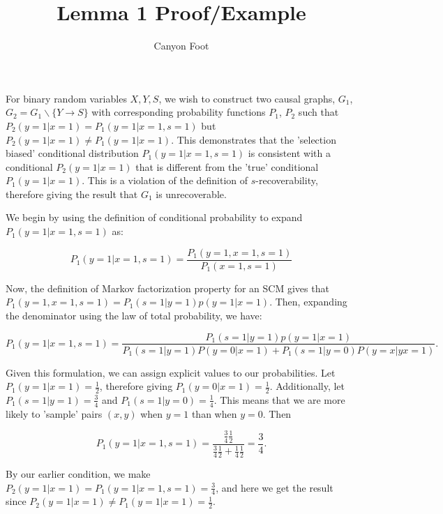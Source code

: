 \documentclass[12pt]{article}
\title{\vspace{-3cm} Lemma 1 Proof/Example}
\author{Canyon Foot}
\begin{document}
\maketitle

For binary random variables $X,Y,S$, we wish to construct two causal graphs, $G_1$, $G_2 = G_1 \backslash \{Y \rightarrow S\}$ with corresponding probability functions $P_1$, $P_2$ such that $P_2(y = 1 | x = 1) = P_1(y = 1 | x =1, s = 1)$ but $P_2(y = 1 | x = 1) \neq P_1(y = 1 | x =1)$. This demonstrates that the 'selection biased' conditional distribution $P_1(y = 1 | x =1, s = 1)$ is consistent with a conditional $P_2(y = 1 | x = 1)$ that is different from the 'true' conditional $P_1(y = 1 | x = 1)$. This is a violation of the definition of $s$-recoverability, therefore giving the result that $G_1$ is unrecoverable. 




We begin by using the definition of conditional probability to expand $P_1(y = 1 | x =1, s = 1)$ as:

$$P_1(y = 1 | x =1, s = 1) = \frac{P_1(y = 1, x =1, s = 1)}{P_1(x =1, s = 1)}$$

Now, the definition of Markov factorization property for an SCM gives that $P_1(y = 1, x =1, s = 1) =  P_1(s=1 | y = 1)p(y = 1 | x = 1)$. Then, expanding the denominator using the law of total probability, we have:

$$P_1(y = 1 | x =1, s = 1)  = \frac{P_1(s=1 | y = 1)p(y = 1 | x = 1)}{P_1(s=1 | y = 1)P(y = 0 | x = 1) + P_1(s=1 | y = 0)P(y = x | yx= 1)}.$$

Given this formulation, we can assign explicit values to our probabilities. Let $P_1(y = 1 | x = 1) = \frac{1}{2}$, therefore giving $P_1(y= 0 | x = 1) = \frac{1}{2}$. Additionally, let $P_1(s= 1 | y =1) = \frac{3}{4}$ and $P_1(s = 1 | y = 0) = \frac{1}{4}$. This means that we are more likely to 'sample' pairs $(x,y)$ when $y = 1$ than when $y = 0$. Then 

$$P_1(y = 1 | x =1, s = 1)  = \frac{\frac{3}{4}\frac{1}{2}}{\frac{3}{4}\frac{1}{2}+\frac{1}{4}\frac{1}{2}} = \frac{3}{4}.$$

By our earlier condition, we make $P_2(y = 1 | x = 1) = P_1(y = 1 | x =1, s = 1) = \frac{3}{4}$, and here we get the result since $P_2(y = 1 | x = 1) \neq P_1(y = 1 | x = 1) = \frac{1}{2}$. 
\end{document}
